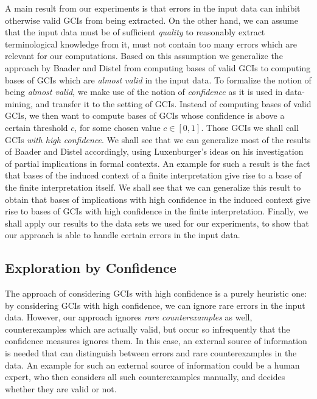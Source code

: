 A main result from our experiments is that errors in the input data can inhibit otherwise
valid GCIs from being extracted.  On the other hand, we can assume that the input data
must be of sufficient \emph{quality} to reasonably extract terminological knowledge from
it, \ie must not contain too many errors which are relevant for our computations.  Based
on this assumption we generalize the approach by Baader and Distel from computing bases of
valid GCIs to computing bases of GCIs which are \emph{almost valid} in the input data.  To
formalize the notion of being \emph{almost valid}, we make use of the notion of
\emph{confidence} as it is used in data-mining, and transfer it to the setting of GCIs.
Instead of computing bases of valid GCIs, we then want to compute bases of GCIs whose
confidence is above a certain threshold $c$, for some chosen value $c \in [0,1]$.  Those
GCIs we shall call GCIs \emph{with high confidence}.  We shall see that we can generalize
most of the results of Baader and Distel accordingly, using Luxenburger's ideas on his
investigation of partial implications in formal contexts.  An example for such a result is
the fact that bases of the induced context of a finite interpretation give rise to a base
of the finite interpretation itself.  We shall see that we can generalize this result to
obtain that bases of implications with high confidence in the induced context give rise to
bases of GCIs with high confidence in the finite interpretation.  Finally, we shall apply
our results to the data sets we used for our experiments, to show that our approach is
able to handle certain errors in the input data.

\subsection{Exploration by Confidence}
\label{sec:expl-conf-2}

The approach of considering GCIs with high confidence is a purely heuristic one: by
considering GCIs with high confidence, we can ignore rare errors in the input data.
However, our approach ignores \emph{rare counterexamples} as well, \ie counterexamples
which are actually valid, but occur so infrequently that the confidence measures ignores
them.  In this case, an external source of information is needed that can distinguish
between errors and rare counterexamples in the data.  An example for such an external
source of information could be a human expert, who then considers all such counterexamples
manually, and decides whether they are valid or not.

